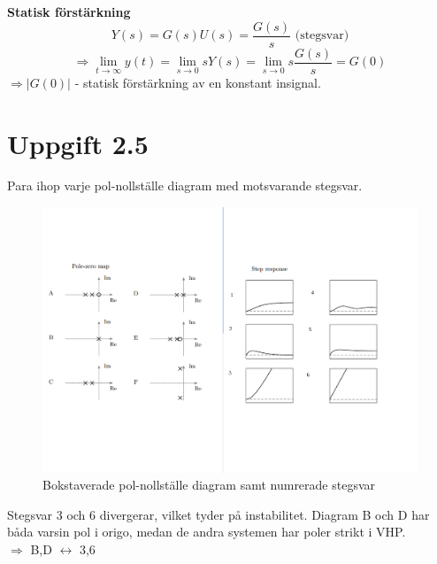 \documentclass[12pt]{article}
\begin{document}
\textbf{Statisk förstärkning} \\
\begin{equation*}
  Y(s) = G(s)U(s) = \frac{G(s)}{s} \text{   (stegsvar)}
\end{equation*}
\begin{equation*}
  \Rightarrow \lim_{t \to \infty} y(t) = \lim_{s \to 0}sY(s) = \lim_{s \to 0} s \frac{G(s)}{s} = G(0)
\end{equation*}
$\Rightarrow |G(0)|$ - statisk förstärkning av en konstant insignal.

\section*{Uppgift 2.5}

Para ihop varje pol-nollställe diagram med motsvarande stegsvar.

\begin{figure}[h!]
  \centering
  \includegraphics[width=\textwidth]{2_5}
  \caption{Bokstaverade pol-nollställe diagram samt numrerade stegsvar}
  \label{fig:exercise25}
\end{figure}
\FloatBarrier

Stegsvar 3 och 6 divergerar, vilket tyder på instabilitet. Diagram B och D har båda varsin pol i origo, medan de andra systemen har poler strikt i VHP. \\
$\Rightarrow$ B,D $\leftrightarrow$ 3,6 \\
\end{document}
